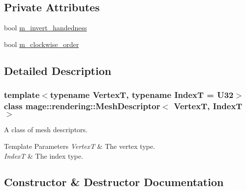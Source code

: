 \subsection*{Private Attributes}
\begin{DoxyCompactItemize}
\item 
bool \hyperlink{classmage_1_1rendering_1_1_mesh_descriptor_a61d5b541414f827f43ec835c7f2da462}{m\+\_\+invert\+\_\+handedness}
\item 
bool \hyperlink{classmage_1_1rendering_1_1_mesh_descriptor_a24ad440002ac7a4db6f0cb642ae1477d}{m\+\_\+clockwise\+\_\+order}
\end{DoxyCompactItemize}


\subsection{Detailed Description}
\subsubsection*{template$<$typename VertexT, typename IndexT = U32$>$\newline
class mage\+::rendering\+::\+Mesh\+Descriptor$<$ Vertex\+T, Index\+T $>$}

A class of mesh descriptors.


\begin{DoxyTemplParams}{Template Parameters}
{\em VertexT} & The vertex type. \\
\hline
{\em IndexT} & The index type. \\
\hline
\end{DoxyTemplParams}


\subsection{Constructor \& Destructor Documentation}
\hypertarget{classmage_1_1rendering_1_1_mesh_descriptor_a1b0ebe38d5591dda224370a7533f0c13}{}\label{classmage_1_1rendering_1_1_mesh_descriptor_a1b0ebe38d5591dda224370a7533f0c13} 

